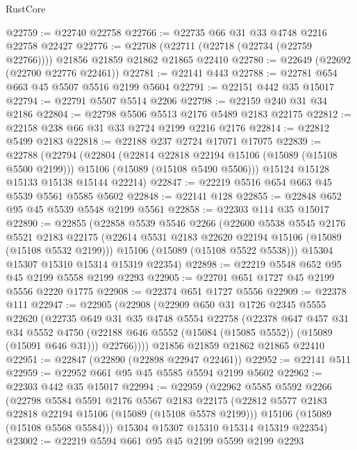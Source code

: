 \begin{lexlean}{RustCore}
\begin{coremodule}
@22759 := @22740 @22758
@22766 := @22735 @66 @31 @33 @4748 @2216 @22758 @22427
@22776 := @22708 (@22711 (@22718 (@22734 (@22759 @22766)))) @21856 @21859 @21862 @21865 @22410
@22780 := @22649 (@22692 (@22700 @22776 @22461))
@22781 := @22141 @443
@22788 := @22781 @654 @663 @45 @5507 @5516 @2199 @5604
@22791 := @22151 @442 @35 @15017
@22794 := @22791 @5507 @5514 @2206
@22798 := @22159 @240 @31 @34 @2186
@22804 := @22798 @5506 @5513 @2176 @5489 @2183 @22175
@22812 := @22158 @238 @66 @31 @33 @2724 @2199 @2216 @2176
@22814 := @22812 @5499 @2183
@22818 := @22188 @237 @2724 @17071 @17075
@22839 := @22788
    (@22794
      (@22804
        (@22814 @22818 @22194 @15106 (@15089 (@15108 @5500 @2199)))
        @15106
        (@15089 (@15108 @5490 @5506)))
      @15124
      @15128
      @15133
      @15138
      @15144
      @22214)
@22847 := @22219 @5516 @654 @663 @45 @5539 @5561 @5585 @5602
@22848 := @22141 @128
@22855 := @22848 @652 @95 @45 @5539 @5548 @2199 @5561
@22858 := @22303 @114 @35 @15017
@22890 := @22855
    (@22858
      @5539
      @5546
      @2266
      (@22600
        @5538
        @5545
        @2176
        @5521
        @2183
        @22175
        (@22614 @5531 @2183 @22620 @22194 @15106 (@15089 (@15108 @5532 @2199)))
        @15106
        (@15089 (@15108 @5522 @5538)))
      @15304
      @15307
      @15310
      @15314
      @15319
      @22354)
@22898 := @22219 @5548 @652 @95 @45 @2199 @5558 @2199 @2293
@22905 := @22701 @651 @1727 @45 @2199 @5556 @2220 @1775
@22908 := @22374 @651 @1727 @5556
@22909 := @22378 @111
@22947 := @22905
    (@22908
      (@22909
        @650
        @31
        @1726
        @2345
        @5555
        @22620
        (@22735
          @649
          @31
          @35
          @4748
          @5554
          @22758
          (@22378
            @647
            @457
            @31
            @34
            @5552
            @4750
            (@22188 @646 @5552 (@15084 (@15085 @5552)) (@15089 (@15091 @646 @31)))
            @22766))))
    @21856
    @21859
    @21862
    @21865
    @22410
@22951 := @22847 (@22890 (@22898 @22947 @22461))
@22952 := @22141 @511
@22959 := @22952 @661 @95 @45 @5585 @5594 @2199 @5602
@22962 := @22303 @442 @35 @15017
@22994 := @22959
    (@22962
      @5585
      @5592
      @2266
      (@22798
        @5584
        @5591
        @2176
        @5567
        @2183
        @22175
        (@22812 @5577 @2183 @22818 @22194 @15106 (@15089 (@15108 @5578 @2199)))
        @15106
        (@15089 (@15108 @5568 @5584)))
      @15304
      @15307
      @15310
      @15314
      @15319
      @22354)
@23002 := @22219 @5594 @661 @95 @45 @2199 @5599 @2199 @2293

\end{coremodule}
\end{lexlean}
